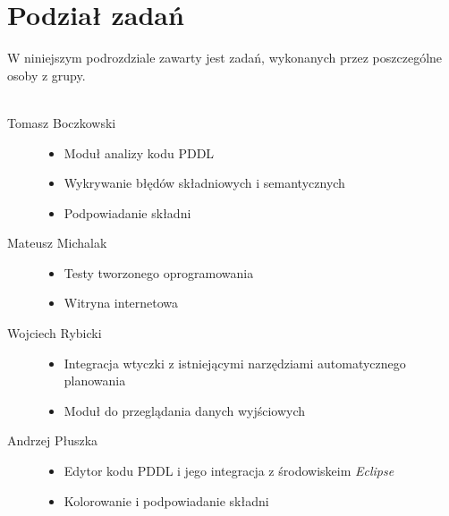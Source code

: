 \section{Podział zadań}
W niniejszym podrozdziale zawarty jest zadań, wykonanych przez poszczególne osoby z grupy.\\\\
\begin{description}
  \item[Tomasz Boczkowski] \hfill 
  \begin{itemize}
\item Moduł analizy kodu PDDL
\item Wykrywanie błędów składniowych i semantycznych
\item Podpowiadanie składni
\end{itemize}
  \item[Mateusz Michalak] \hfill 
    \begin{itemize}
\item Testy tworzonego oprogramowania
\item Witryna internetowa
\end{itemize}
  \item[Wojciech Rybicki] \hfill 
    \begin{itemize}
\item Integracja wtyczki z istniejącymi narzędziami automatycznego planowania
\item Moduł do przeglądania danych wyjściowych
\end{itemize}
  \item[Andrzej Płuszka] \hfill 
    \begin{itemize}
\item Edytor kodu PDDL i jego integracja z środowiskeim \textit{Eclipse}
\item Kolorowanie i podpowiadanie składni
\end{itemize}
\end{description}





